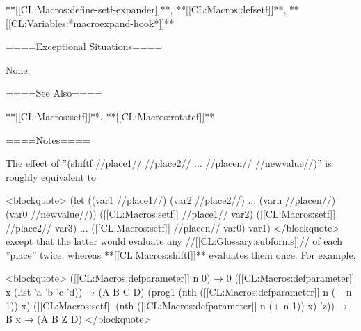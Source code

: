 **[[CL:Macros:define-setf-expander]]**, **[[CL:Macros:defsetf]]**, **[[CL:Variables:*macroexpand-hook*]]**

====Exceptional Situations====

None.

====See Also====

**[[CL:Macros:setf]]**, **[[CL:Macros:rotatef]]**, {\secref\GeneralizedReference}

====Notes====

The effect of ''(shiftf //place1// //place2// ... //placen// //newvalue//)'' is roughly equivalent to

<blockquote> (let ((var1 //place1//) (var2 //place2//) ... (varn //placen//) (var0 //newvalue//)) ([[CL:Macros:setf]] //place1// var2) ([[CL:Macros:setf]] //place2// var3) ... ([[CL:Macros:setf]] //placen// var0) var1) </blockquote> except that the latter would evaluate any //[[CL:Glossary:subforms]]// of each ''place'' twice, whereas **[[CL:Macros:shiftf]]** evaluates them once. For example,

<blockquote> ([[CL:Macros:defparameter]] n 0) → 0 ([[CL:Macros:defparameter]] x (list 'a 'b 'c 'd)) → (A B C D) (prog1 (nth ([[CL:Macros:defparameter]] n (+ n 1)) x) ([[CL:Macros:setf]] (nth ([[CL:Macros:defparameter]] n (+ n 1)) x) 'z)) → B x → (A B Z D) </blockquote>

 
